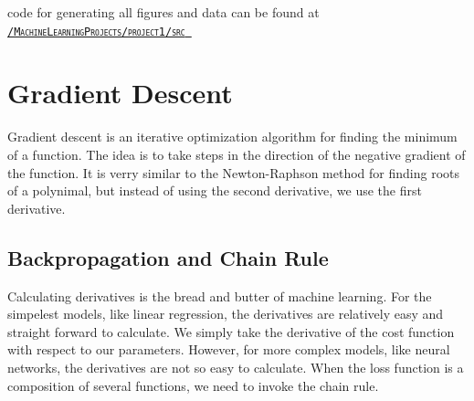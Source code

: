 \documentclass[twoside,11pt]{report}
\begin{document}
\begin{center}
    \scriptsize code for generating all figures and data can be found at 
    \href{https://github.com/bragewiseth/MachineLearningProjects/tree/main/project1/src}{\tt \textsc{/MachineLearningProjects/project1/src} }
\end{center}




\section{Gradient Descent}
\label{sec:GD}

Gradient descent is an iterative optimization algorithm for finding the minimum of a function.
The idea is to take steps in the direction of the negative gradient of the function. It is
verry similar to the Newton-Raphson method for finding roots of a polynimal,
but instead of using the second derivative, we use the first derivative.


\subsection{Backpropagation and Chain Rule}
\label{sec:backpropagation}

Calculating derivatives is the bread and butter of machine learning. For the simpelest models, like linear regression,
the derivatives are relatively easy and straight forward to calculate. We simply take the derivative of the cost function
with respect to our parameters. However, for more complex models, like neural networks, the derivatives are not so easy to calculate.
When the loss function is a composition of several functions, we need to invoke the chain rule. 
\end{document}
